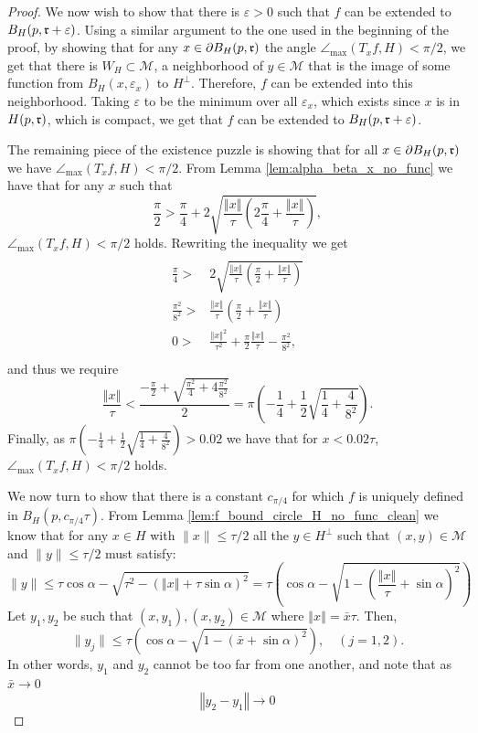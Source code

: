 \documentclass[12pt]{article}
\theoremstyle{remark}
\newcommand{\MM}{\mathcal{M}}
\newcommand{\eps}{\varepsilon}
\newcommand{\norm}[1]{\left\Vert #1 \right\Vert}
\newcommand{\maxangle}{\angle_{\max}}
\begin{document}
\begin{appendices}
\begin{proof}
We now wish to show that there is $\eps>0$ such that $f$ can be extended to $B_H(p, \frak{r} + \eps)$.
Using a similar argument to the one used in the beginning of the proof, by showing that for any $x\in\partial B_H(p, \frak{r})$ the angle $\maxangle(T_x f, H) < \pi/2$, we get that there is $W_H\subset\MM$, a neighborhood of $y\in \MM$ that is the image of some function from $B_H(x,\eps_x)$ to $H^\perp$.
Therefore, $f$ can be extended into this neighborhood.
Taking $\eps$ to be the minimum over all $\eps_x$, which exists since $x$ is in $H(p, \frak{r})$, which is compact, we get that $f$ can be extended to $B_H(p, \frak{r}+ \eps)$.

The remaining piece of the existence puzzle is showing that for all $x\in\partial B_H(p, \frak{r})$ we have $\maxangle(T_x f, H) < \pi/2$.
From Lemma \ref{lem:alpha_beta_x_no_func} we have that for any $x$ such that 
\[
\frac{\pi}{2} > \frac{\pi}{4} + 2\sqrt{\frac{\norm{x}}{\tau}\left(2\frac{\pi}{4} + \frac{\norm{x}}{\tau}\right)},
\]
$\maxangle(T_xf,H) <\pi/2$ holds.
Rewriting the inequality we get
\[
\begin{array}{cc}
      \\
    \frac{\pi}{4} > & 2\sqrt{\frac{\norm{x}}{\tau}\left(\frac{\pi}{2} + \frac{\norm{x}}{\tau}\right)} \\
    \frac{\pi^2}{8^2} > & \frac{\norm{x}}{\tau}\left(\frac{\pi}{2} + \frac{\norm{x}}{\tau}\right)\\
    0 > & \frac{\norm{x}^2}{\tau^2} + \frac{\pi}{2} \frac{\norm{x}}{\tau} - \frac{\pi^2}{8^2},\\
\end{array}
\]
and thus we require
\[
\frac{\norm{x}}{\tau} < \frac{-\frac{\pi}{2} + \sqrt{\frac{\pi^2}{4} + 4 \frac{\pi^2}{8^2} }}{2} = 
\pi \left(-\frac{1}{4} + \frac{1}{2}\sqrt{\frac{1}{4} + \frac{4}{8^2} }\right)
.\]
Finally, as 
$\pi \left(-\frac{1}{4} + \frac{1}{2}\sqrt{\frac{1}{4} + \frac{4}{8^2} }\right) >0.02$ we have that for $x<0.02\tau$,
$\maxangle(T_xf,H) <\pi/2$ holds.

We now turn to show that there is a constant $c_{\pi/4}$ for which $f$ is uniquely defined in $B_H(p, c_{\pi/4}\tau)$.
From Lemma \ref{lem:f_bound_circle_H_no_func_clean} we know that for any $x \in H$ with $\|x\|\leq \tau/2$ all the $y\in H^\perp$ such that $(x,y)\in\MM$ and $\|y\| \leq \tau/2$ must satisfy:
\begin{equation}
    \|y\| \leq \tau\cos\alpha-\sqrt{\tau^2-(\norm{x} + \tau\sin\alpha)^2} = \tau\left(\cos\alpha-\sqrt{1-(\frac{\norm{x}}{\tau} + \sin\alpha)^2}\right)
\end{equation}
Let $y_1, y_2$ be such that $(x,y_1),(x,y_2)\in\MM$ where $\norm{x}=\bar x\tau$.
Then,
\begin{equation}
    \|y_j\| \leq \tau\left(\cos\alpha-\sqrt{1-(\bar x+ \sin\alpha)^2}\right),\quad (j=1,2)
.\end{equation}
In other words, $y_1$ and $y_2$ cannot be too far from one another, and note that as $\bar x \to 0$
\begin{equation}\label{eq:y2_y1_diff}
\norm{y_2 - y_1} \to 0
\end{equation}


\end{proof}
\end{appendices}
\end{document}
